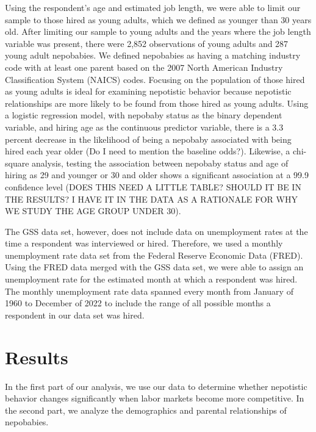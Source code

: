 \documentclass[12pt]{article}
\begin{document}
Using the respondent’s age and estimated job length, we were able to limit our sample to those hired as young adults, which we defined as younger than 30 years old. After limiting our sample to young adults and the years where the job length variable was present, there were 2,852  observations of young adults and 287 young adult nepobabies. We defined nepobabies as having a matching industry code with at least one parent based on the 2007 North American Industry Classification System (NAICS) codes. Focusing on the population of those hired as young adults is ideal for examining nepotistic behavior because nepotistic relationships are more likely to be found from those hired as young adults. Using a logistic regression model, with nepobaby status as the binary dependent variable, and hiring age as the continuous predictor variable, there is a 3.3 percent decrease in the likelihood of being a nepobaby associated with being hired each year older (Do I need to mention the baseline odds?). Likewise, a chi-square analysis, testing the association between nepobaby status and age of hiring as 29 and younger or 30 and older shows a significant association at a 99.9 confidence level (DOES THIS NEED A LITTLE TABLE? SHOULD IT BE IN THE RESULTS? I HAVE IT IN THE DATA AS A RATIONALE FOR WHY WE STUDY THE AGE GROUP UNDER 30).

The GSS data set, however, does not include data on unemployment rates at the time a respondent was interviewed or hired. Therefore, we used a monthly unemployment rate data set from the Federal Reserve Economic Data (FRED). Using the FRED data merged with the GSS data set, we were able to assign an unemployment rate for the estimated month at which a respondent was hired. The monthly unemployment rate data spanned every month from January of 1960 to December of 2022 to include the range of all possible months a respondent in our data set was hired. 


\section{Results}
\label{sec:result}

In the first part of our analysis, we use our data to determine whether nepotistic behavior changes significantly when labor markets become more competitive. In the second part, we analyze the demographics and parental relationships of nepobabies.
\end{document}
